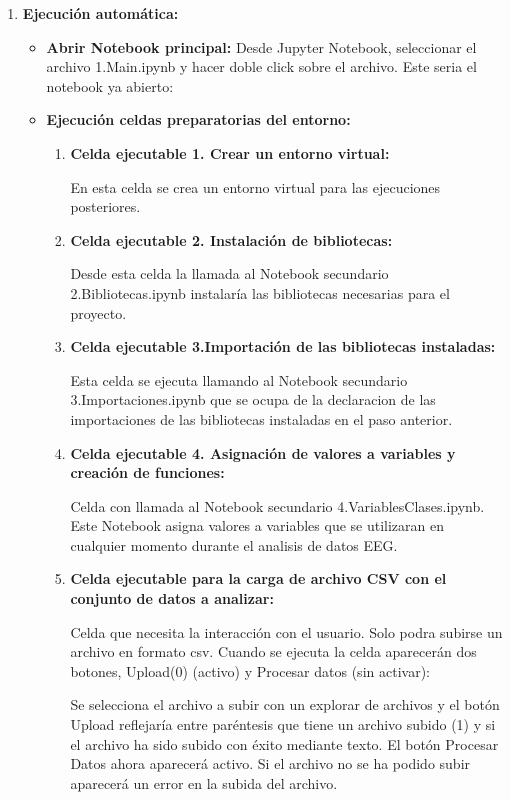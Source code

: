 \begin{enumerate}
\def\labelenumi{\arabic{enumi}.}
\tightlist
\item \textbf{Ejecución automática:}
  \begin{itemize}
   \tightlist
   \item
    \textbf{Abrir Notebook principal:} Desde Jupyter Notebook, seleccionar el archivo 1.Main.ipynb y hacer doble click sobre el archivo. Este seria el notebook ya abierto:
    
   \item
   \textbf{Ejecución celdas preparatorias del entorno: }
	\begin{enumerate}
	\def\labelenumi{\arabic{enumi}.}
	\tightlist
	\item 
	\textbf{Celda ejecutable 1. Crear un entorno virtual: }
	
	En esta celda se crea un entorno virtual para las ejecuciones posteriores.
	\item 
	\textbf{Celda ejecutable 2. Instalación de bibliotecas:}
	
	Desde esta celda la llamada al Notebook secundario 2.Bibliotecas.ipynb instalaría las bibliotecas necesarias para el proyecto.
	\item 
	\textbf{Celda ejecutable 3.Importación de las bibliotecas instaladas:}
	
	Esta celda se ejecuta llamando al Notebook secundario 3.Importaciones.ipynb que se ocupa de la declaracion de las importaciones de las bibliotecas instaladas en el paso anterior.
	
	\item 
	\textbf{Celda ejecutable 4. Asignación de valores a variables y creación de funciones:}
	
	Celda con llamada al Notebook secundario 4.VariablesClases.ipynb. Este Notebook asigna valores a variables que se utilizaran en cualquier momento durante el analisis de datos EEG.
	
	\item 
	\textbf{Celda ejecutable para la carga de archivo CSV con el conjunto de datos a analizar:}
	
	Celda que necesita la interacción con el usuario. Solo podra subirse un archivo en formato csv. Cuando se ejecuta la celda aparecerán dos botones, Upload(0) (activo) y Procesar datos (sin activar):
	
	
	Se selecciona el archivo a subir con un explorar de archivos y el botón Upload reflejaría entre paréntesis que tiene un archivo subido (1) y si el archivo ha sido subido con éxito mediante texto. El botón Procesar Datos ahora aparecerá activo. Si el archivo no se ha podido subir aparecerá un error en la subida del archivo.
	

\end{enumerate}
\end{itemize}
\end{enumerate}
